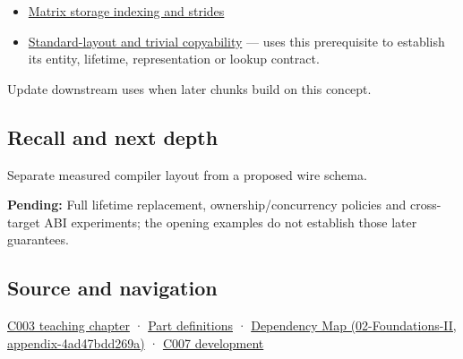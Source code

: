 \begin{itemize}
\item
  \hyperref[appendix-ffdc1d4e5350]{Matrix storage indexing and strides}
\item
  \hyperref[appendix-958870a64c53]{Standard-layout and trivial copyability} --- uses this prerequisite to establish its entity, lifetime, representation or lookup contract.
\end{itemize}

Update downstream uses when later chunks build on this concept.

\subsection{Recall and next depth}\label{recall-and-next-depth}

Separate measured compiler layout from a proposed wire schema.

\textbf{Pending:} Full lifetime replacement, ownership/concurrency policies and cross-target ABI experiments; the opening examples do not establish those later guarantees.

\subsection{Source and navigation}\label{source-and-navigation}

\href{Continuous\%20Notes/Computing\%20Foundations\%20-\%20From\%20Bits\%20to\%20C++\%20and\%20Systems\%20APIs\#Where\%20the\%20bytes\%20live}{C003 teaching chapter} · \hyperref[appendix-fd090d982a15]{Part definitions} · \href{}{Dependency Map (02-Foundations-II, appendix-4ad47bdd269a)} · \href{Continuous\%20Notes/Computing\%20Foundations\%20-\%20From\%20Bits\%20to\%20C++\%20and\%20Systems\%20APIs\#Bringing\%20the\%20object\%20model\%20back\%20to\%20bytes}{C007 development}
